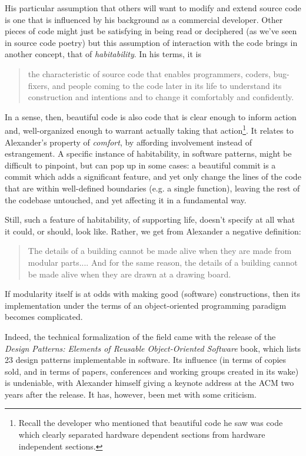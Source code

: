 \documentclass{article}
\begin{document}
His particular assumption that others will want to modify and extend source code is one that is influenced by his background as a commercial developer. Other pieces of code might just be satisfying in being read or deciphered (as we've seen in source code poetry) but this assumption of interaction with the code brings in another concept, that of \emph{habitability}. In his terms, it is

\begin{quote}
  the characteristic of source code that enables programmers, coders, bug-fixers, and people coming to the code later in its life to understand its construction and intentions and to change it comfortably and confidently.\cite{gabriel_patterns_1998}
\end{quote}

In a sense, then, beautiful code is also code that is clear enough to inform action and, well-organized enough to warrant actually taking that action\footnote{Recall the developer who mentioned that beautiful code he saw was code which clearly separated hardware dependent sections from hardware independent sections.}. It relates to Alexander's property of \emph{comfort}, by affording involvement instead of estrangement. A specific instance of habitability, in software patterns, might be difficult to pinpoint, but can pop up in some cases: a beautiful commit is a commit which adds a significant feature, and yet only change the lines of the code that are within well-defined boundaries (e.g. a single function), leaving the rest of the codebase untouched, and yet affecting it in a fundamental way.

Still, such a feature of habitability, of supporting life, doesn't specify at all what it could, or should, look like. Rather, we get from Alexander a negative definition:

\begin{quote}
  The details of a building cannot be made alive when they are made from modular parts.... And for the same reason, the details of a building cannot be made alive when they are drawn at a drawing board.\cite{alexander_timeless_1979}
\end{quote}

If modularity itself is at odds with making good (software) constructions, then its implementation under the terms of an object-oriented programming paradigm becomes complicated.

Indeed, the technical formalization of the field came with the release of the \emph{Design Patterns: Elements of Reusable Object-Oriented Software} book, which lists 23 design patterns implementable in software\cite{gamma_design_1994}. Its influence (in terms of copies sold, and in terms of papers, conferences and working groups created in its wake) is undeniable, with Alexander himself giving a keynote address at the ACM two years after the release. It has, however, been met with some criticism.
\end{document}
